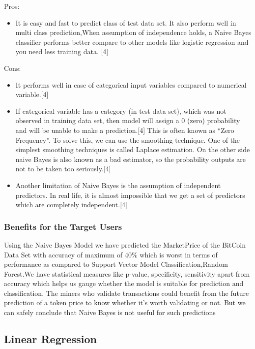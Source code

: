 \documentclass{article}
\begin{document}
Pros:
\begin{itemize}
\item It is easy and fast to predict class of test data set. It also perform well in multi class prediction,When assumption of independence holds, a Naive Bayes classifier performs better compare to other models like logistic regression and you need less training data. [4] 
\end{itemize}

Cons:
\begin{itemize}
\item It performs well in case of categorical input variables compared to numerical variable.[4] 

\item If categorical variable has a category (in test data set), which was not observed in training data set, then model will assign a 0 (zero) probability and will be unable to make a prediction.[4] This is often known as “Zero Frequency”. To solve this, we can use the smoothing technique. One of the simplest smoothing techniques is called Laplace estimation.
On the other side naive Bayes is also known as a bad estimator, so the probability outputs are not to be taken too seriously.[4] 

\item Another limitation of Naive Bayes is the assumption of independent predictors. In real life, it is almost impossible that we get a set of predictors which are completely independent.[4]

\end{itemize}

\subsubsection {Benefits for the Target Users}
Using the  Naive Bayes Model we have predicted the Market\textunderscore Price of the BitCoin Data Set with accuracy of maximum of 40\% which is worst in terms of performance as compared to Support Vector Model Classification,Random Forest.We have statistical measures like p-value, specificity, sensitivity apart from accuracy which helps us gauge whether the model is suitable for prediction and classification. The miners who validate transactions could benefit from the future prediction of a token price to know whether it's worth validating or not. But we can safely conclude that Naive Bayes is not useful for such predictions 

\subsection{Linear Regression}
\end{document}
